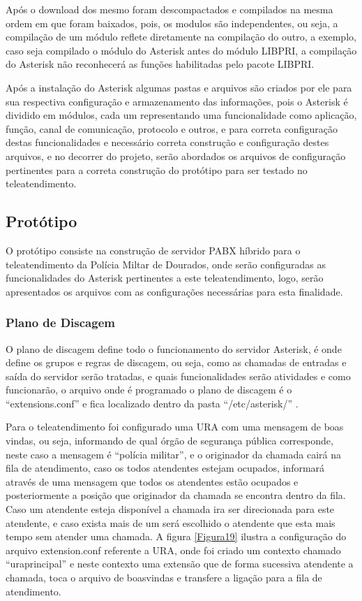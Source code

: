Após o download dos mesmo foram descompactados e compilados na mesma ordem em que foram baixados, pois, os modulos são independentes, ou seja, a compilação de um módulo reflete diretamente na compilação do outro, a exemplo, caso seja compilado o módulo do Asterisk antes do módulo LIBPRI, a compilação do Asterisk não reconhecerá as funções habilitadas pelo pacote LIBPRI.

Após a instalação do Asterisk algumas pastas e arquivos são criados por ele para sua respectiva configuração e armazenamento das informações, pois o Asterisk é dividido em módulos, cada um representando uma funcionalidade como aplicação, função, canal de comunicação, protocolo e outros, e para correta configuração destas funcionalidades e necessário correta construção e configuração destes arquivos, e no decorrer do projeto, serão abordados os arquivos de configuração pertinentes para a correta construção do protótipo para ser testado no teleatendimento.

\subsection{Protótipo}
O protótipo consiste na construção de servidor PABX híbrido para o teleatendimento da Polícia Miltar de Dourados, onde serão configuradas as funcionalidades do Asterisk pertinentes a este teleatendimento, logo, serão apresentados os arquivos com as configurações necessárias para esta finalidade.

\subsubsection{Plano de Discagem}
O plano de discagem define todo o funcionamento do servidor Asterisk, é onde define os grupos e regras de discagem, ou seja, como as chamadas de entradas e saída do servidor serão tratadas, e quais funcionalidades serão atividades e como funcionarão, o arquivo onde é programado o plano de discagem é o ``extensions.conf'' e fica localizado dentro da pasta ``/etc/asterisk/'' \cite{alexandrekeller2014}.

Para o teleatendimento foi configurado uma URA com uma mensagem de boas vindas, ou seja, informando de qual órgão de segurança pública corresponde, neste caso a mensagem é “polícia militar”, e o originador da chamada cairá na fila de atendimento,  caso os todos atendentes estejam ocupados, informará através de uma mensagem que todos os atendentes estão ocupados e posteriormente a posição que originador da chamada se encontra dentro da fila. Caso um atendente esteja disponível a chamada ira ser direcionada para este atendente, e caso exista mais de um será escolhido o atendente que esta mais tempo sem atender uma chamada. A figura \ref{Figura19} ilustra a configuração do arquivo extension.conf referente a URA, onde foi criado um contexto chamado “uraprincipal” e neste contexto uma extensão que de forma sucessiva atendente a chamada, toca o arquivo de boasvindas e transfere a ligação para a fila de atendimento.

